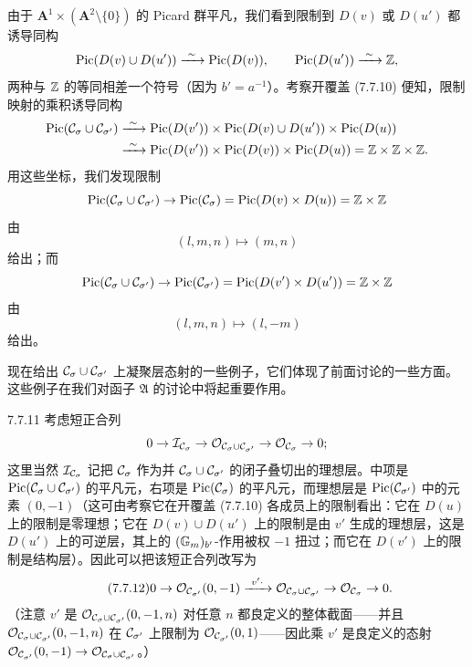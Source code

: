 由于 $\mathbf A^1\times(\mathbf A^2\setminus\{0\})$ 的 Picard 群平凡，我们看到限制到 $D(v)$ 或 $D(u')$ 都诱导同构
\[
\mathrm{Pic}(D(v)\cup D(u'))\xrightarrow{\ \sim\ }\mathrm{Pic}(D(v)),\qquad
\mathrm{Pic}(D(u'))\xrightarrow{\ \sim\ }\mathbb{Z},
\]
两种与 $\mathbb{Z}$ 的等同相差一个符号（因为 $b'=a^{-1}$）。考察开覆盖 (7.7.10) 便知，限制映射的乘积诱导同构
\begin{align*}
\mathrm{Pic}(\CC_\sigma\cup\CC_{\sigma'})&\xrightarrow{\ \sim\ }\mathrm{Pic}(D(v'))\times\mathrm{Pic}(D(v)\cup D(u'))\times\mathrm{Pic}(D(u))\\
&\xrightarrow{\ \sim\ }\mathrm{Pic}(D(v'))\times\mathrm{Pic}(D(v))\times\mathrm{Pic}(D(u))=\Z\times\Z\times\Z.
\end{align*}
用这些坐标，我们发现限制
\[
\mathrm{Pic}(\mathcal{C}_\sigma\cup\mathcal{C}_{\sigma'})\to\mathrm{Pic}(\mathcal{C}_\sigma)=\mathrm{Pic}(D(v)\times D(u))=\mathbb{Z}\times\mathbb{Z}
\]
由
\[
(l,m,n)\mapsto(m,n)
\]
给出；而
\[
\mathrm{Pic}(\mathcal{C}_\sigma\cup\mathcal{C}_{\sigma'})\to\mathrm{Pic}(\mathcal{C}_{\sigma'})=\mathrm{Pic}(D(v')\times D(u'))=\mathbb{Z}\times\mathbb{Z}
\]
由
\[
(l,m,n)\mapsto(l,-m)
\]
给出。

现在给出 $\mathcal{C}_\sigma\cup\mathcal{C}_{\sigma'}$ 上凝聚层态射的一些例子，它们体现了前面讨论的一些方面。这些例子在我们对函子 $\mathfrak A$ 的讨论中将起重要作用。

\begin{exam}{7.7.11}\label{thm:a4-7-7-11}
考虑短正合列
\[
0\to\mathcal I_{\mathcal{C}_\sigma}\to\mathcal{O}_{\mathcal{C}_\sigma\cup\mathcal{C}_{\sigma'}}\to\mathcal{O}_{\mathcal{C}_\sigma}\to0;
\]
这里当然 $\mathcal I_{\mathcal{C}_\sigma}$ 记把 $\mathcal{C}_\sigma$ 作为并 $\mathcal{C}_\sigma\cup\mathcal{C}_{\sigma'}$ 的闭子叠切出的理想层。中项是 $\mathrm{Pic}(\mathcal{C}_\sigma\cup\mathcal{C}_{\sigma'})$ 的平凡元，右项是 $\mathrm{Pic}(\mathcal{C}_\sigma)$ 的平凡元，而理想层是 $\mathrm{Pic}(\mathcal{C}_{\sigma'})$ 中的元素 $(0,-1)$（这可由考察它在开覆盖 (7.7.10) 各成员上的限制看出：它在 $D(u)$ 上的限制是零理想；它在 $D(v)\cup D(u')$ 上的限制是由 $v'$ 生成的理想层，这是 $D(u')$ 上的可逆层，其上的 $(\mathbb{G}_m)_{b'}$-作用被权 $-1$ 扭过；而它在 $D(v')$ 上的限制是结构层）。因此可以把该短正合列改写为
\begin{equation}\tag{7.7.12}\label{eq:a4-7-7-12}
0\to\OO_{\CC_{\sigma'}}(0,-1)\xrightarrow{\ v'\cdot\ }\OO_{\CC_\sigma\cup\CC_{\sigma'}}\to\OO_{\CC_\sigma}\to0.
\end{equation}
（注意 $v'$ 是 $\mathcal{O}_{\mathcal{C}_\sigma\cup\mathcal{C}_{\sigma'}}(0,-1,n)$ 对任意 $n$ 都良定义的整体截面——并且 $\mathcal{O}_{\mathcal{C}_\sigma\cup\mathcal{C}_{\sigma'}}(0,-1,n)$ 在 $\mathcal{C}_{\sigma'}$ 上限制为 $\mathcal{O}_{\mathcal{C}_{\sigma'}}(0,1)$——因此乘 $v'$ 是良定义的态射 $\mathcal{O}_{\mathcal{C}_{\sigma'}}(0,-1)\to\mathcal{O}_{\mathcal{C}_\sigma\cup\mathcal{C}_{\sigma'}}$。）
\end{exam}

